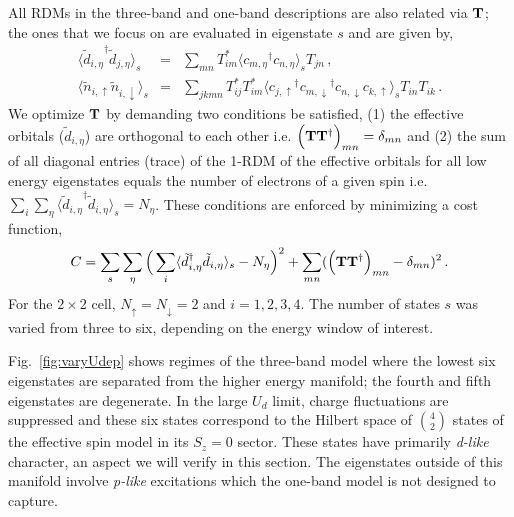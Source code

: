 All RDMs in the three-band and one-band descriptions are also related via ${\bf T}$; 
the ones that we focus on are evaluated in eigenstate $s$ and are given by,
\begin{subequations}
\begin{eqnarray}
	\langle {\tilde{d}_{i,\eta}}^{\dagger} \tilde{d}_{j,\eta} \rangle_{s} &=& \sum_{mn} T^{*}_{im} \langle {c_{m,\eta}}^{\dagger} c_{n,\eta} \rangle_{s} T_{jn} \label{eq:dmstransformations1} \,,\\
	\langle \tilde{n}_{i,\uparrow} \tilde{n}_{i,\downarrow} \rangle_{s} &=& \sum_{jkmn} T^{*}_{ij} T^{*}_{im} \langle {c_{j,\uparrow}}^{\dagger} {c_{m,\downarrow}}^{\dagger} c_{n,\downarrow} c_{k,\uparrow} \rangle_{s} T_{in} T_{ik}\,.
\label{eq:dmstransformations2}
\end{eqnarray}
\end{subequations}
We optimize ${\bf T}$ by demanding two conditions be satisfied, (1) the effective orbitals ($\tilde{d}_{i,\eta}$) 
are orthogonal to each other i.e. $\Big({\bf T} {\bf T}^{\dagger}\Big)_{mn} = \delta_{mn}$
and (2) the sum of all diagonal entries (trace) of the 1-RDM of the effective orbitals for all low energy eigenstates 
equals the number of electrons of a given spin i.e. $\sum_{i} \sum_{\eta} \langle {\tilde{d}_{i,\eta}}^{\dagger} \tilde{d}_{i,\eta} \rangle_{s} = N_{\eta}$. 
These conditions are enforced by minimizing a cost function,
\begin{equation}
C = \sum_{s} \sum_{\eta} \Big( \sum_{i} \langle \tilde{d}_{i,\eta}^{\dagger} \tilde{d}_{i,\eta} \rangle_{s} - N_{\eta} \Big)^{2} + \sum_{mn} ( \Big({\bf T} {\bf T}^{\dagger}\Big)_{mn} -\delta_{mn})^{2}\,.
\label{eq:C}
\end{equation} 
For the $2\times2$ cell, $N_{\uparrow}=N_{\downarrow}=2$ and $i=1,2,3,4$. 
The number of states $s$ was varied from three to six, depending on the energy window of interest.  

Fig.~\ref{fig:varyUdep} shows regimes of the three-band model where 
the lowest six eigenstates are separated from the higher energy manifold; the 
fourth and fifth eigenstates are degenerate. 
In the large $U_d$ limit, charge fluctuations are suppressed and these six 
states correspond to the Hilbert space of $4 \choose 2$ states of the effective spin model in its $S_z=0$ sector.
These states have primarily \textit{d-like} character, an aspect we will verify in this section. 
The eigenstates outside of this manifold involve \textit{p-like} excitations which the one-band model is not designed 
to capture. 


